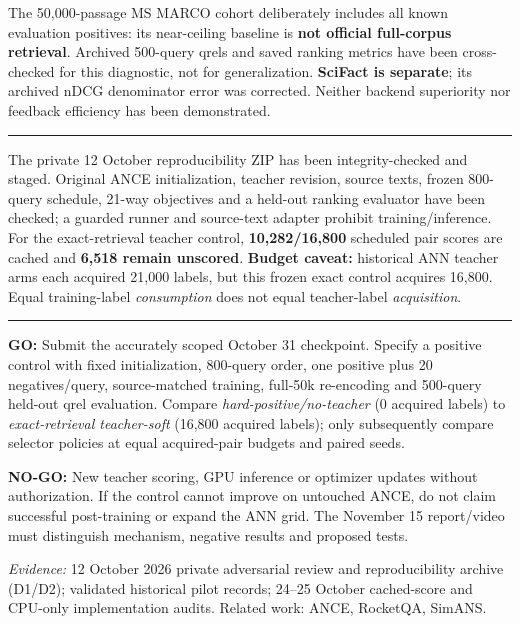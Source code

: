 \documentclass[10pt]{article}
\newcommand{\sect}[1]{\vspace{5pt}{\large\bfseries #1}\par\vspace{3pt}\hrule\vspace{6pt}}
\begin{document}
The 50,000-passage MS MARCO cohort deliberately includes all known evaluation positives: its near-ceiling baseline is \textbf{not official full-corpus retrieval}. Archived 500-query qrels and saved ranking metrics have been cross-checked for this diagnostic, not for generalization. \textbf{SciFact is separate}; its archived nDCG denominator error was corrected. Neither backend superiority nor feedback efficiency has been demonstrated.

\sect{What is ready; what remains}
The private 12 October reproducibility ZIP has been integrity-checked and staged. Original ANCE initialization, teacher revision, source texts, frozen 800-query schedule, 21-way objectives and a held-out ranking evaluator have been checked; a guarded runner and source-text adapter prohibit training/inference. For the exact-retrieval teacher control, \textbf{10,282/16,800} scheduled pair scores are cached and \textbf{6,518 remain unscored}. \textbf{Budget caveat:} historical ANN teacher arms each acquired 21,000 labels, but this frozen exact control acquires 16,800. Equal training-label \emph{consumption} does not equal teacher-label \emph{acquisition}.

\sect{Decision and November 15 experiment gate}
\textbf{GO:} Submit the accurately scoped October 31 checkpoint. Specify a positive control with fixed initialization, 800-query order, one positive plus 20 negatives/query, source-matched training, full-50k re-encoding and 500-query held-out qrel evaluation. Compare \emph{hard-positive/no-teacher} (0 acquired labels) to \emph{exact-retrieval teacher-soft} (16,800 acquired labels); only subsequently compare selector policies at equal acquired-pair budgets and paired seeds.

\textbf{NO-GO:} New teacher scoring, GPU inference or optimizer updates without authorization. If the control cannot improve on untouched ANCE, do not claim successful post-training or expand the ANN grid. The November 15 report/video must distinguish mechanism, negative results and proposed tests.

{\footnotesize\emph{Evidence:} 12 October 2026 private adversarial review and reproducibility archive (D1/D2); validated historical pilot records; 24--25 October cached-score and CPU-only implementation audits. Related work: ANCE, RocketQA, SimANS.}
\end{document}
